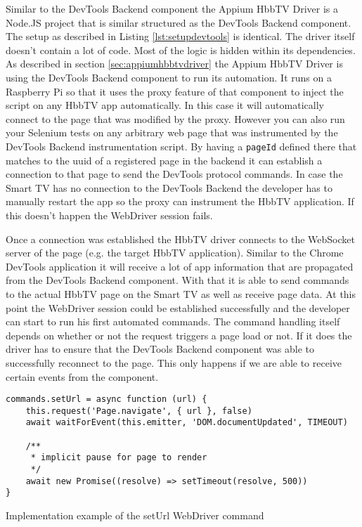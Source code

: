 Similar to the DevTools Backend component the Appium HbbTV Driver is a Node.JS project that is similar
structured as the DevTools Backend component. The setup as described in Listing \ref{lst:setupdevtools}
is identical. The driver itself doesn't contain a lot of code. Most of the logic is hidden within its
dependencies. As described in section \ref{sec:appiumhbbtvdriver} the Appium HbbTV Driver is using the
DevTools Backend component to run its automation. It runs on a Raspberry Pi so that it uses the proxy
feature of that component to inject the script on any HbbTV app automatically. In this case it will
automatically connect to the page that was modified by the proxy. However you can also run your Selenium
tests on any arbitrary web page that was instrumented by the DevTools Backend instrumentation script.
By having a \texttt{pageId} defined there that matches to the uuid of a registered page in the backend
it can establish a connection to that page to send the DevTools protocol commands. In case the Smart
TV has no connection to the DevTools Backend the developer has to manually restart the app so the proxy
can instrument the HbbTV application. If this doesn't happen the WebDriver session fails.

Once a connection was established the HbbTV driver connects to the WebSocket server of the page (e.g.
the target HbbTV application). Similar to the Chrome DevTools application it will receive a lot of
app information that are propagated from the DevTools Backend component. With that it is able to send
commands to the actual HbbTV page on the Smart TV as well as receive page data. At this point the
WebDriver session could be established successfully and the developer can start to run his first automated
commands. The command handling itself depends on whether or not the request triggers a page load or not.
If it does the driver has to ensure that the DevTools Backend component was able to successfully reconnect
to the page. This only happens if we are able to receive certain events from the component.

\begin{listing}[H]
\begin{verbatim}
commands.setUrl = async function (url) {
    this.request('Page.navigate', { url }, false)
    await waitForEvent(this.emitter, 'DOM.documentUpdated', TIMEOUT)

    /**
     * implicit pause for page to render
     */
    await new Promise((resolve) => setTimeout(resolve, 500))
}
\end{verbatim}
\caption{Implementation example of the setUrl WebDriver command}
\label{lst:setUrl}
\end{listing}

